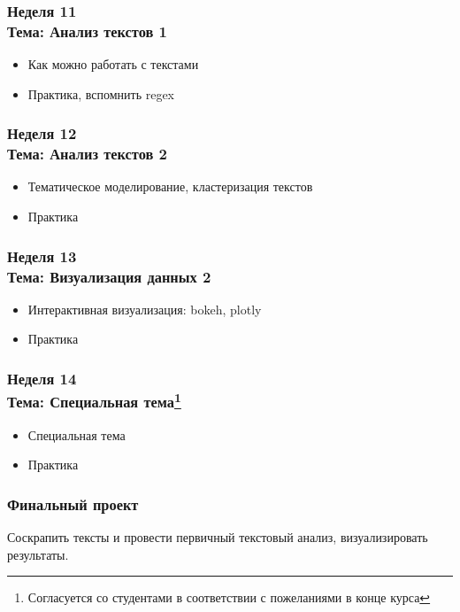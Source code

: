 \documentclass[a4paper,11pt]{article}
\begin{document}
\subsubsection{Неделя 11\\ Тема: Анализ текстов 1} 

\begin{itemize}
    \item Как можно работать с текстами
    \item Практика, вспомнить regex
\end{itemize}

\subsubsection{Неделя 12\\ Тема: Анализ текстов 2} 

\begin{itemize}
    \item Тематическое моделирование, кластеризация текстов
    \item Практика
\end{itemize}


\subsubsection{Неделя 13\\ Тема: Визуализация данных 2}

\begin{itemize}
    \item Интерактивная визуализация: bokeh, plotly
    \item Практика
\end{itemize}

\subsubsection{Неделя 14\\ Тема: Специальная тема\footnote{Согласуется со студентами в соответствии с пожеланиями в конце курса}}

\begin{itemize}
    \item Специальная тема
    \item Практика
\end{itemize}


\subsubsection{Финальный проект}
Соскрапить тексты и провести первичный текстовый анализ, визуализировать результаты.
\end{document}
